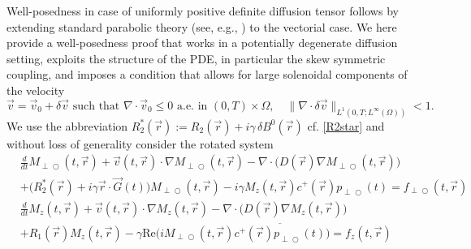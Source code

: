 \documentclass{ws-m3as}
\renewcommand\Re{\mathrm{Re}}
\def\Mpp{M_{\perp\!\!\!\!\!\bigcirc}}
\def\pp{p_{\perp\!\!\!\!\!\bigcirc}}
\def\fpp{f_{\perp\!\!\!\!\!\bigcirc}}
\begin{document}
Well-posedness in case of uniformly positive definite diffusion tensor follows by extending standard parabolic theory (see, e.g., \cite[Section 7.1]{EvansBook}) to the vectorial case. 
We here provide a well-posedness proof that works in a potentially degenerate diffusion setting, exploits the structure of the PDE, in particular the skew symmetric coupling, and imposes a condition that allows for large solenoidal components of the velocity 
\begin{equation}\label{divv}
{\vec v}={\vec v}_0+\delta {\vec v}\text{ such that }\nabla\cdot{\vec v}_0\leq0\text{ a.e. in }(0,T)\times\Omega, \quad \|\nabla\cdot\delta{\vec v}\|_{L^1(0,T;L^\infty(\Omega))}<1. 
\end{equation}
We use the abbreviation $R_2^*(\vec r):=R_2(\vec r)+i\gamma\,\delta B^0 (\vec r)$ cf. \eqref{R2star} and without loss of generality  consider the rotated system
\begin{equation}\label{eqn:bloch-torrey-complex_rot_f}
\begin{aligned}
&\frac{d}{dt}\Mpp(t, \vec r)+{\vec v}(t, \vec r)\cdot\nabla \Mpp(t, \vec r) -\nabla\cdot\bigl(D(\vec r) \nabla \Mpp(t, \vec r)\bigr) \\
&+\bigl(R_2^*(\vec r)+i\gamma\vec r \cdot \vec G(t)\bigr)\Mpp(t, \vec r)
-i\gamma M_z(t, \vec r)c^+(\vec r)\pp(t)= \fpp(t, \vec r)\\    
&\frac{d}{dt}M_z(t, \vec r)+{\vec v}(t, \vec r)\cdot\nabla M_z(t, \vec r) -\nabla\cdot\bigl(D(\vec r) \nabla M_z(t, \vec r)\bigr) \\
&+R_1(\vec r) M_z(t, \vec r)
-\gamma\Re\bigl(i\Mpp(t, \vec r)\overline{c^+(\vec r)\pp(t)}\bigr)=f_z(t, \vec r)
\end{aligned}
\end{equation}
\end{document}

